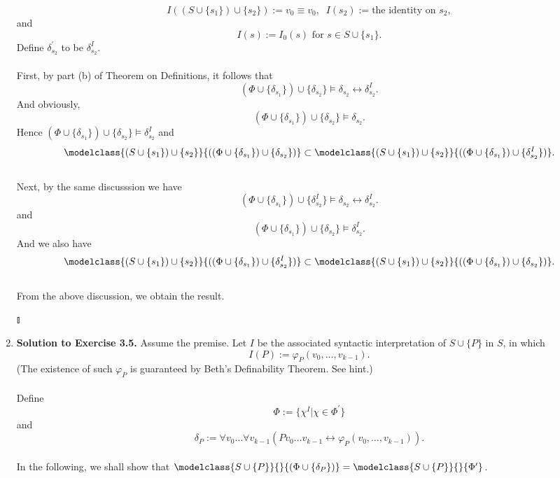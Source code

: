 \begin{enumerate}[1.]
\[
I((S \cup \{ s_1 \}) \cup \{ s_2 \}) := v_0 \equiv v_0, \;\; I(s_2) := \mbox{the identity on $s_2$},
\]
and
\[
\mbox{$I(s) := I_0(s)$ for $s \in S \cup \{ s_1 \}$}.
\]
Define $\delta^\prime_{s_2}$ to be $\delta^I_{s_2}$.
\ 
\\
\\
First, by part (b) of Theorem on Definitions, it follows that
\[
(\Phi \cup \{ \delta_{s_1} \}) \cup \{ \delta_{s_2} \} \models \delta_{s_2} \leftrightarrow \delta^I_{s_2}.
\]
And obviously,
\[
(\Phi \cup \{ \delta_{s_1} \}) \cup \{ \delta_{s_2} \} \models \delta_{s_2}.
\]
Hence $(\Phi \cup \{ \delta_{s_1} \}) \cup \{ \delta_{s_2} \} \models \delta^I_{s_2}$ and
\[
\modelclass{(S \cup \{ s_1 \}) \cup \{ s_2 \}}{((\Phi \cup \{ \delta_{s_1} \}) \cup \{ \delta_{s_2} \})} \subset \modelclass{(S \cup \{ s_1 \}) \cup \{ s_2 \}}{((\Phi \cup \{ \delta_{s_1} \}) \cup \{ \delta_{s_2}^I \})}.
\]
\ 
\\
Next, by the same discusssion we have
\[
(\Phi \cup \{ \delta_{s_1} \}) \cup \{ \delta^I_{s_2} \} \models \delta_{s_2} \leftrightarrow \delta^I_{s_2}.
\]
and
\[
(\Phi \cup \{ \delta_{s_1} \}) \cup \{ \delta_{s_2} \} \models \delta^I_{s_2}.
\]
And we also have
\[
\modelclass{(S \cup \{ s_1 \}) \cup \{ s_2 \}}{((\Phi \cup \{ \delta_{s_1} \}) \cup \{ \delta^I_{s_2} \})} \subset \modelclass{(S \cup \{ s_1 \}) \cup \{ s_2 \}}{((\Phi \cup \{ \delta_{s_1} \}) \cup \{ \delta_{s_2} \})}.
\]
\ 
\\
From the above discussion, we obtain the result. \begin{flushright}$\talloblong$\end{flushright}
%
\item \textbf{Solution to Exercise 3.5.} Assume the premise. Let $I$ be the associated syntactic interpretation of $S \cup \{ P \}$ in $S$, in which
\[
I(P) := \varphi_P(v_0, \ldots, v_{k - 1}).
\]
(The existence of such $\varphi_P$ is guaranteed by Beth's Definability Theorem. See hint.)
\\
\\
Define
\[
\Phi := \{ \chi^I | \chi \in \Phi^\prime \}
\]
and
\[
\delta_P := \forall v_0 \ldots \forall v_{k - 1}(Pv_0 \ldots v_{k - 1} \leftrightarrow \varphi_P(v_0, \ldots, v_{k - 1})).
\]
\\
In the following, we shall show that $\modelclass{S \cup \{ P \}}{}{(\Phi \cup \{ \delta_P \})} = \modelclass{S \cup \{ P \}}{}{\Phi^\prime}$.

\end{enumerate}
